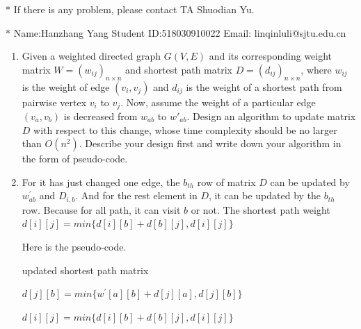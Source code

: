 \documentclass[12pt,a4paper]{article}
\makeatletter
\newtheorem*{solution}{Solution}
\theoremstyle{definition}
\renewenvironment{solution}[1][Solution] {\par\pushQED{\qed}\normalfont\topsep6\p@\@plus6\p@\relax\trivlist\item[\hskip\labelsep\bfseries#1\@addpunct{.}]\ignorespaces}{\popQED\endtrivlist\@endpefalse} \makeatother
\makeatother
\begin{document}
\noindent

\noindent{}
\begin{center}
\footnotesize{\color{red}$*$ If there is any problem, please contact TA Shuodian Yu. }

\footnotesize{\color{blue}$*$ Name:Hanzhang Yang  \quad Student ID:518030910022 \quad Email: linqinluli@sjtu.edu.cn}
\end{center}
\begin{enumerate}
\item Given a weighted directed graph $G(V, E)$ and its corresponding weight matrix $W=(w_{ij})_{n \times n}$ and shortest path matrix $D=(d_{ij})_{n \times n}$, where $w_{ij}$ is the weight of edge $(v_i, v_j)$ and $d_{ij}$ is the weight of a shortest path from pairwise vertex $v_i$ to $v_j$. Now, assume the weight of a particular edge $(v_a, v_b)$ is decreased from $w_{ab}$ to $w'_{ab}$. Design an algorithm to update matrix $D$ with respect to this change, whose time complexity should be no larger than $O(n^2)$. Describe your design first and write down your algorithm in the form of pseudo-code.
    \begin{solution}
        For it has just changed one edge, the $b_{th}$ row of matrix $D$ can be updated by $w_{ab}^{'}$ and $D_{i,b}$. And for the rest element in $D$, it can be updated by the $b_{th}$ row. Because for all path, it can visit $b$ or not. The shortest path weight $d[i][j]=min\{d[i][b]+d[b][j],d[i][j]\}$
       
        Here is the pseudo-code.

        \begin{algorithm}[H]
            \BlankLine
            \caption{updated shortest path matrix}
    
            {
                $d[j][b]=min\{w^{'}[a][b]+d[j][a],d[j][b]\}$\;
            }
            {
                {
                    $d[i][j]=min\{d[i][b]+d[b][j],d[i][j]\}$\;
                }
                
}
\end{algorithm}
\end{solution}
\end{enumerate}
\end{document}
